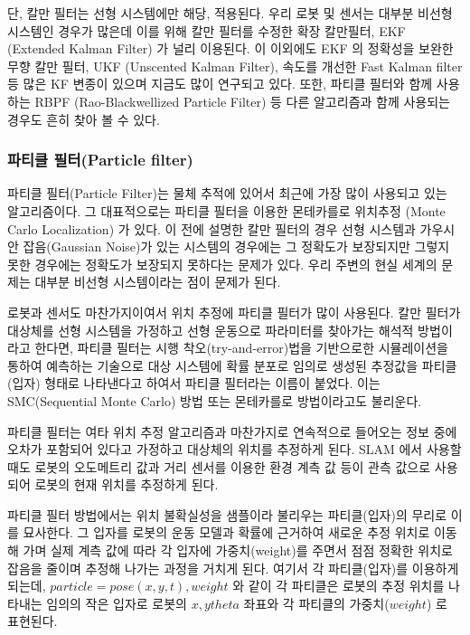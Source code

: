 단, 칼만 필터는 선형 시스템에만 해당, 적용된다. 우리 로봇 및 센서는 대부분 비선형 시스템인 경우가 많은데 이를 위해 칼만 필터를 수정한 확장 칼만필터, EKF (Extended Kalman Filter) 가 널리 이용된다. 이 이외에도 EKF 의 정확성을 보완한 무향 칼만 필터, UKF (Unscented Kalman Filter), 속도를 개선한 Fast Kalman filter 등 많은 KF 변종이 있으며 지금도 많이 연구되고 있다. 또한, 파티클 필터와 함께 사용하는 RBPF (Rao-Blackwellized Particle Filter) 등 다른 알고리즘과 함께 사용되는 경우도 흔히 찾아 볼 수 있다.


\subsubsection{파티클 필터(Particle filter)}

파티클 필터(Particle Filter)는 물체 추적에 있어서 최근에 가장 많이 사용되고 있는 알고리즘이다. 그 대표적으로는 파티클 필터을 이용한 몬테카를로 위치추정 (Monte Carlo Localization) 가 있다. 이 전에 설명한 칼만 필터의 경우 선형 시스템과 가우시안 잡음(Gaussian Noise)가 있는 시스템의 경우에는 그 정확도가 보장되지만 그렇지 못한 경우에는 정확도가 보장되지 못하다는 문제가 있다. 우리 주변의 현실 세계의 문제는 대부분 비선형 시스템이라는 점이 문제가 된다.

로봇과 센서도 마찬가지이여서 위치 추정에 파티클 필터가 많이 사용된다. 칼만 필터가 대상체를 선형 시스템을 가정하고 선형 운동으로 파라미터를 찾아가는 해석적 방법이라고 한다면, 파티클 필터는 시행 착오(try-and-error)법을 기반으로한 시뮬레이션을 통하여 예측하는 기술으로 대상 시스템에 확률 분포로 임의로 생성된 추정값을 파티클(입자) 형태로 나타낸다고 하여서 파티클 필터라는 이름이 붙었다. 이는 SMC(Sequential Monte Carlo) 방법 또는 몬테카를로 방법이라고도 불리운다.

파티클 필터는 여타 위치 추정 알고리즘과 마찬가지로 연속적으로 들어오는 정보 중에 오차가 포함되어 있다고 가정하고 대상체의 위치를 추정하게 된다. SLAM 에서 사용할 때도 로봇의 오도메트리 값과 거리 센서를 이용한 환경 계측 값 등이 관측 값으로 사용되어 로봇의 현재 위치를 추정하게 된다. 

파티클 필터 방법에서는 위치 불확실성을 샘플이라 불리우는 파티클(입자)의 무리로 이를 묘사한다. 그 입자를 로봇의 운동 모델과 확률에 근거하여 새로운 추정 위치로 이동해 가며 실제 계측 값에 따라 각 입자에 가중치(weight)를 주면서 점점 정확한 위치로 잡음을 줄이며 추정해 나가는 과정을 거치게 된다. 여기서 각 파티클(입자)를 이용하게 되는데, $particle = pose(x,y,t), weight$ 와 같이 각 파티클은 로봇의 추정 위치를 나타내는 임의의 작은 입자로 로봇의 $x, y theta$ 좌표와 각 파티클의 가중치($weight$) 로 표현된다. 


